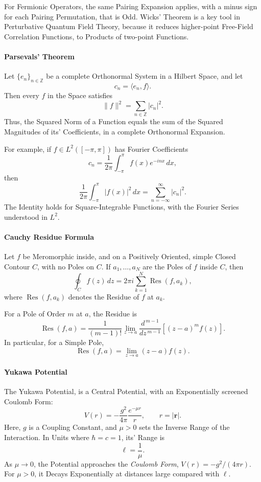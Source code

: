 \documentclass[a4paper, 10pt, onepage]{elegantbook}
\begin{document}
{For Fermionic Operators, the same Pairing Expansion applies, with a minus sign for each Pairing Permutation, that is 
Odd. Wicks' Theorem is a key tool in Perturbative Quantum Field Theory, because it reduces higher-point Free-Field 
Correlation Functions, to Products of two-point Functions.

\paragraph{Parsevals' Theorem}

\noindent

Let $\{e_n\}_{n\in\mathbb{Z}}$ be a complete Orthonormal System in a Hilbert Space, and let
\[
c_n=\langle e_n,f\rangle.
\]
Then every $f$ in the Space satisfies
\[
\|f\|^2=\sum_{n\in\mathbb{Z}}|c_n|^2.
\]
Thus, the Squared Norm of a Function equals the sum of the Squared Magnitudes of its' Coefficients, in a complete 
Orthonormal Expansion.  

For example, if $f\in L^2([-\pi,\pi])$ has Fourier Coefficients
\[
c_n=\frac{1}{2\pi}\int_{-\pi}^{\pi}f(x)e^{-inx}\,dx,
\]
then
\[
\frac{1}{2\pi}\int_{-\pi}^{\pi}|f(x)|^2\,dx
=
\sum_{n=-\infty}^{\infty}|c_n|^2.
\]
The Identity holds for Square-Integrable Functions, with the Fourier Series understood in $L^2$.

\paragraph{Cauchy Residue Formula}

\noindent

Let $f$ be Meromorphic inside, and on a Positively Oriented, simple Closed Contour $C$, with no Poles on $C$. If 
$a_1,\ldots,a_N$ are the Poles of $f$ inside $C$, then
\[
\oint_C f(z)\,dz
=
2\pi i\sum_{k=1}^{N}\operatorname{Res}(f,a_k),
\]
where $\operatorname{Res}(f,a_k)$ denotes the Residue of $f$ at $a_k$.  

For a Pole of Order $m$ at $a$, the Residue is
\[
\operatorname{Res}(f,a)
=
\frac{1}{(m-1)!}
\lim_{z\to a}
\frac{d^{\,m-1}}{dz^{\,m-1}}
\left[(z-a)^m f(z)\right].
\]
In particular, for a Simple Pole,
\[
\operatorname{Res}(f,a)=\lim_{z\to a}(z-a)f(z).
\]

\paragraph{Yukawa Potential}

\noindent

The Yukawa Potential, is a Central Potential, with an Exponentially screened Coulomb Form:
\[
V(r)
=
-\frac{g^2}{4\pi}\frac{e^{-\mu r}}{r},
\qquad r=|\mathbf{r}|.
\]
Here, $g$ is a Coupling Constant, and $\mu>0$ sets the Inverse Range of the Interaction. In Units where $\hbar=c=1$, 
its' Range is
\[
\ell=\frac{1}{\mu}.
\]
As $\mu\to 0$, the Potential approaches the \emph{Coulomb Form}, $V(r)=-g^2/(4\pi r)$. For $\mu>0$, it Decays 
Exponentially at distances large compared with $\ell$.  

}
\end{document}
